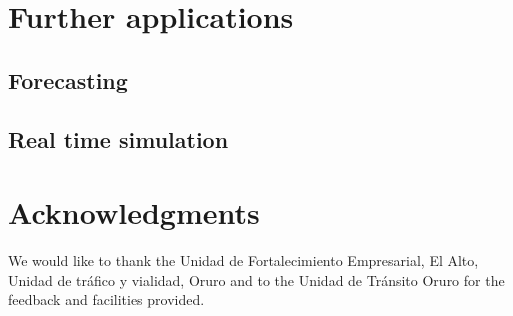 \documentclass[fleqn,12pt]{SelfArx} %
\begin{document}


\section{Further applications}

\subsection{Forecasting}

\subsection{Real time simulation}

\section*{Acknowledgments} %


We would like to thank the Unidad de Fortalecimiento Empresarial, El Alto, Unidad de tráfico y vialidad, Oruro and to the Unidad de Tránsito Oruro for the feedback and facilities provided.




\end{document}
